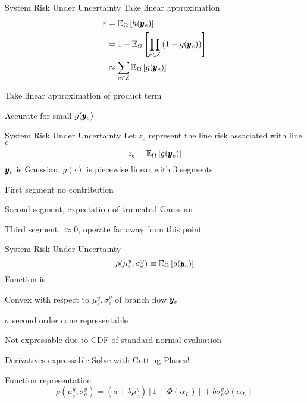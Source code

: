 \begin{frame}{System Risk Under Uncertainty}
Take linear approximation
\begin{align*}
r &= \mathbb{E}_{\Omega} \left[ h(\pmb{y}_e) \right]  \\
  &= 1 - \mathbb{E}_{\Omega} \left[ \prod_{e \in {\cal E}}\left( 1 - g(\pmb{y}_e)\right)  \right] \\
  &\approx \sum_{e \in {\cal E}} \mathbb{E}_{\Omega} \left[ g(\pmb{y}_e) \right]
\end{align*}
\bi
\item Take linear approximation of product term
\item Accurate for small $g(\pmb{y}_e)$
\ei
\end{frame}
\begin{frame}{System Risk Under Uncertainty}
Let $z_e$ represent the line risk associated with line $e$
\begin{equation*}
 z_e = \mathbb{E}_{\Omega} \left[ g(\pmb{y}_e) \right]
\end{equation*}
$\pmb{y}_e$ is Gaussian, $g(\cdot)$ is piecewise linear with 3 segments
\pause
\bi
\item First segment no contribution
\item Second segment, expectation of truncated Gaussian
\item Third segment, $\approx 0$, operate far away from this point
\ei
\end{frame}

\begin{frame}{System Risk Under Uncertainty}
\vspace{10pt}
\begin{equation*}
\rho(\mu^y_e,\sigma^y_e) \equiv \mathbb{E}_{\Omega} \left[ g(\pmb{y}_e) \right]
\end{equation*}
\EBR
Function is
\pause
\bi
\item Convex with respect to $\mu^y_e, \sigma^y_e$ of branch flow $\pmb{y}_e$
\bi
\item $\sigma$ second order cone representable
\ei
\item Not expressable due to CDF of standard normal evaluation
\bi
\item Derivatives expressable
\ei
\ei
\pause
Solve with \alert{Cutting Planes!}

Function representation
\[ \rho(\mu^y_e,\sigma^y_e) = (a + b \mu^y_e)\left[ 1 - \Phi(\alpha_L) \right]  + b \sigma^y_e \phi(\alpha_L) \]

\end{frame}

